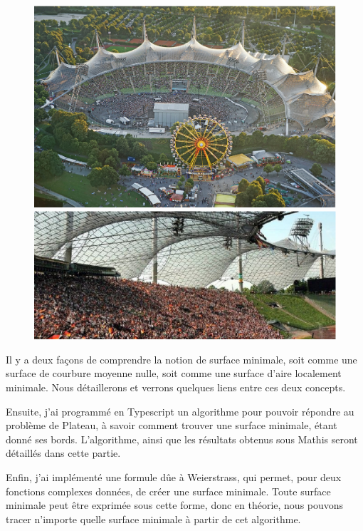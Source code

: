 \documentclass {report}
\begin{document}
\begin{figure}[h!]
   \begin{minipage}[b]{0.45\linewidth}
      \centering\includegraphics[scale=0.3]{Images_Fichiers/stade1.eps}
   \end{minipage}
    \begin{minipage}[b]{0.50\linewidth}   
     \centering\includegraphics[scale=0.35]{Images_Fichiers/stade2.eps}
   \end{minipage}
\end{figure}

Il y a deux façons de comprendre la notion de surface minimale, soit comme une surface de courbure moyenne nulle, soit comme une surface d'aire localement minimale. Nous détaillerons et verrons quelques liens entre ces deux concepts.

Ensuite, j'ai programmé en Typescript un algorithme pour pouvoir répondre au problème de Plateau, à savoir comment trouver une surface minimale, étant donné ses bords. L'algorithme, ainsi que les résultats obtenus sous Mathis seront détaillés dans cette partie.

Enfin, j'ai implémenté une formule dûe à Weierstrass, qui permet, pour deux fonctions complexes données, de créer une surface minimale. Toute surface minimale peut être exprimée sous cette forme, donc en théorie, nous pouvons tracer n'importe quelle surface minimale à partir de cet algorithme. 
\end{document}

